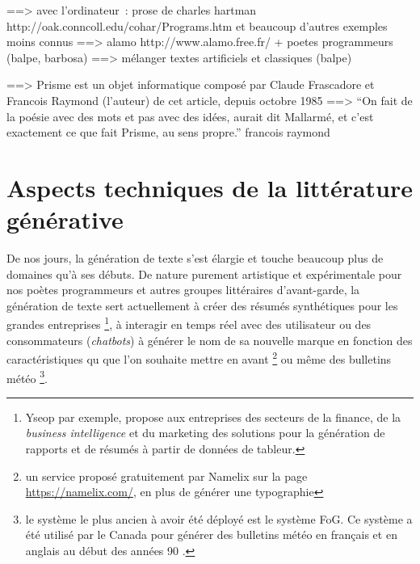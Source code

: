 \documentclass{article}
\begin{document}
			
				
				==> avec l'ordinateur~: prose de charles hartman http://oak.conncoll.edu/cohar/Programs.htm et beaucoup d'autres exemples moins connus
				==> alamo http://www.alamo.free.fr/ + poetes programmeurs (balpe, barbosa)
				==> mélanger textes artificiels et classiques (balpe)
				
				==> Prisme est un objet informatique composé par Claude Frascadore et Francois Raymond (l'auteur) de cet article, depuis octobre 1985 
				==> “On fait de la poésie avec des mots et pas avec des idées, aurait dit Mallarmé, et c'est exactement ce que fait Prisme, au sens propre.” francois raymond
	

	\section{Aspects techniques de la littérature générative}\label{aspects_tech}
		De nos jours, la génération de texte s'est élargie et touche beaucoup plus de domaines qu'à ses débuts. De nature purement artistique et expérimentale pour nos poètes programmeurs et autres groupes littéraires d'avant-garde, la génération de texte sert actuellement à créer des résumés synthétiques pour les grandes entreprises \footnote{Yseop par exemple, propose aux entreprises des secteurs de la finance, de la \textit{business intelligence} et du marketing des solutions pour la génération de rapports et de résumés à partir de données de tableur.}, à interagir en temps réel avec des utilisateur ou des consommateurs (\textit{chatbots}) à générer le nom de sa nouvelle marque en fonction des caractéristiques qu que l'on souhaite  mettre en avant \footnote{un service proposé gratuitement par Namelix sur la page \href{https://namelix.com/}{https://namelix.com/}, en plus de générer une typographie} ou même des bulletins météo \footnote{le système le plus ancien à avoir été déployé est le système FoG. Ce système a été utilisé par le Canada pour générer des bulletins météo en français et en anglais au début des années 90 \cite{wiki:fog}.}.\\
		
\end{document}
